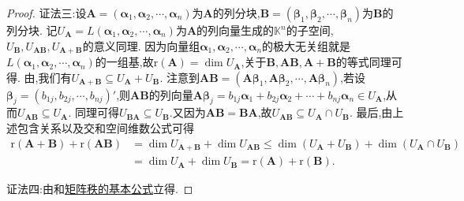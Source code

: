\documentclass[../../main.tex]{subfiles}%
\begin{document}
\begin{proof}
{\color{blue}证法三:}设\(\boldsymbol{A}=(\boldsymbol{\alpha}_1,\boldsymbol{\alpha}_2,\cdots,\boldsymbol{\alpha}_n)\)为\(\boldsymbol{A}\)的列分块,\(\boldsymbol{B}=(\boldsymbol{\beta}_1,\boldsymbol{\beta}_2,\cdots,\boldsymbol{\beta}_n)\)为\(\boldsymbol{B}\)的列分块. 记\(U_{\boldsymbol{A}} = L(\boldsymbol{\alpha}_1,\boldsymbol{\alpha}_2,\cdots,\boldsymbol{\alpha}_n)\)为\(\boldsymbol{A}\)的列向量生成的\(\mathbb{K}^n\)的子空间,\(U_{\boldsymbol{B}},U_{\boldsymbol{A}\boldsymbol{B}},U_{\boldsymbol{A}+\boldsymbol{B}}\)的意义同理. 因为向量组\(\boldsymbol{\alpha}_1,\boldsymbol{\alpha}_2,\cdots,\boldsymbol{\alpha}_n\)的极大无关组就是\(L(\boldsymbol{\alpha}_1,\boldsymbol{\alpha}_2,\cdots,\boldsymbol{\alpha}_n)\)的一组基,故\(\mathrm{r}(\boldsymbol{A})=\dim U_{\boldsymbol{A}}\),关于\(\boldsymbol{B},\boldsymbol{A}\boldsymbol{B},\boldsymbol{A}+\boldsymbol{B}\)的等式同理可得. 由,我们有\(U_{\boldsymbol{A}+\boldsymbol{B}}\subseteq U_{\boldsymbol{A}}+U_{\boldsymbol{B}}\). 注意到\(\boldsymbol{A}\boldsymbol{B}=(\boldsymbol{A}\boldsymbol{\beta}_1,\boldsymbol{A}\boldsymbol{\beta}_2,\cdots,\boldsymbol{A}\boldsymbol{\beta}_n)\),若设\(\boldsymbol{\beta}_j=(b_{1j},b_{2j},\cdots,b_{nj})'\),则\(\boldsymbol{A}\boldsymbol{B}\)的列向量\(\boldsymbol{A}\boldsymbol{\beta}_j=b_{1j}\boldsymbol{\alpha}_1 + b_{2j}\boldsymbol{\alpha}_2+\cdots + b_{nj}\boldsymbol{\alpha}_n\in U_{\boldsymbol{A}}\),从而\(U_{\boldsymbol{A}\boldsymbol{B}}\subseteq U_{\boldsymbol{A}}\). 同理可得\(U_{\boldsymbol{B}\boldsymbol{A}}\subseteq U_{\boldsymbol{B}}\).又因为\(\boldsymbol{A}\boldsymbol{B}=\boldsymbol{B}\boldsymbol{A}\),故\(U_{\boldsymbol{A}\boldsymbol{B}}\subseteq U_{\boldsymbol{A}}\cap U_{\boldsymbol{B}}\). 最后,由上述包含关系以及交和空间维数公式可得
\begin{align*}
\mathrm{r}(\boldsymbol{A}+\boldsymbol{B})+\mathrm{r}(\boldsymbol{A}\boldsymbol{B})&=\dim U_{\boldsymbol{A}+\boldsymbol{B}}+\dim U_{\boldsymbol{A}\boldsymbol{B}}\leqslant \dim(U_{\boldsymbol{A}}+U_{\boldsymbol{B}})+\dim(U_{\boldsymbol{A}}\cap U_{\boldsymbol{B}})\\
&=\dim U_{\boldsymbol{A}}+\dim U_{\boldsymbol{B}}=\mathrm{r}(\boldsymbol{A})+\mathrm{r}(\boldsymbol{B}).
\end{align*}

{\color{blue}证法四:}由和\hyperref[proposition:矩阵秩的基本公式]{矩阵秩的基本公式}立得.

\end{proof}
\end{document}
